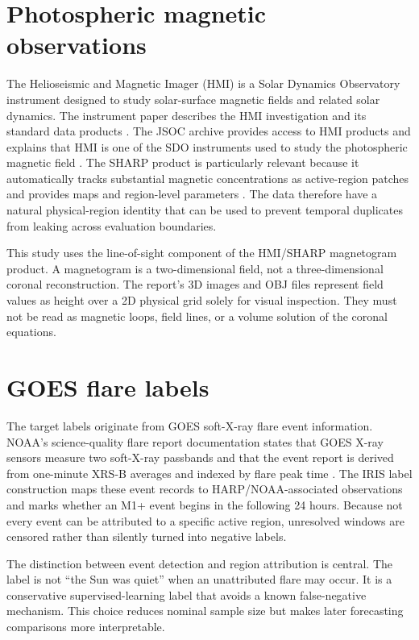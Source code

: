 \documentclass[11pt,oneside]{report}
\begin{document}
\section{Photospheric magnetic observations}

The Helioseismic and Magnetic Imager (HMI) is a Solar Dynamics Observatory instrument designed to study solar-surface magnetic fields and related solar dynamics. The instrument paper describes the HMI investigation and its standard data products \cite{scherrer2012}. The JSOC archive provides access to HMI products and explains that HMI is one of the SDO instruments used to study the photospheric magnetic field \cite{jsoc}. The SHARP product is particularly relevant because it automatically tracks substantial magnetic concentrations as active-region patches and provides maps and region-level parameters \cite{bobra2014}. The data therefore have a natural physical-region identity that can be used to prevent temporal duplicates from leaking across evaluation boundaries.

This study uses the line-of-sight component of the HMI/SHARP magnetogram product. A magnetogram is a two-dimensional field, not a three-dimensional coronal reconstruction. The report’s 3D images and OBJ files represent field values as height over a 2D physical grid solely for visual inspection. They must not be read as magnetic loops, field lines, or a volume solution of the coronal equations.

\section{GOES flare labels}

The target labels originate from GOES soft-X-ray flare event information. NOAA’s science-quality flare report documentation states that GOES X-ray sensors measure two soft-X-ray passbands and that the event report is derived from one-minute XRS-B averages and indexed by flare peak time \cite{noaa_goes_readme}. The IRIS label construction maps these event records to HARP/NOAA-associated observations and marks whether an M1+ event begins in the following 24 hours. Because not every event can be attributed to a specific active region, unresolved windows are censored rather than silently turned into negative labels.

The distinction between event detection and region attribution is central. The label is not “the Sun was quiet” when an unattributed flare may occur. It is a conservative supervised-learning label that avoids a known false-negative mechanism. This choice reduces nominal sample size but makes later forecasting comparisons more interpretable.
\end{document}
